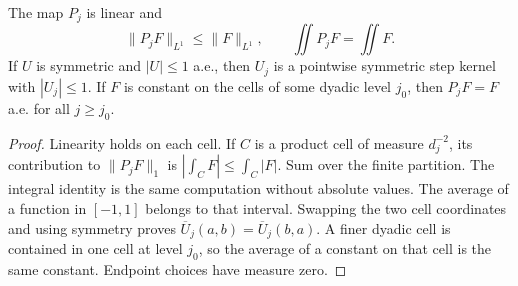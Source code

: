 \begin{lemma}
\label{lem:dyadic-properties}
\proved The map $P_j$ is linear and
\[
 \|P_jF\|_{L^1}\le\|F\|_{L^1},\qquad \iint P_jF=\iint F.
\]
If $U$ is symmetric and $|U|\le1$ a.e., then $U_j$ is a pointwise symmetric step kernel
with $|U_j|\le1$.  If $F$ is constant on the cells of some dyadic level $j_0$, then
$P_jF=F$ a.e. for all $j\ge j_0$.
\end{lemma}
\begin{proof}
Linearity holds on each cell.  If $C$ is a product cell of measure $d_j^{-2}$, its
contribution to $\|P_jF\|_1$ is $|\int_C F|\le\int_C|F|$.  Sum over the finite partition.
The integral identity is the same computation without absolute values.
The average of a function in $[-1,1]$ belongs to that interval.  Swapping the two cell
coordinates and using symmetry proves $\overline U_j(a,b)=\overline U_j(b,a)$.
A finer dyadic cell is contained in one cell at level $j_0$, so the average of a constant
on that cell is the same constant.  Endpoint choices have measure zero.
\end{proof}

